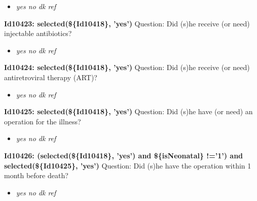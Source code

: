 \documentclass{article}%
\begin{document}
%
\begin{itemize}%
\item%
\textit{yes\newline%
 no\newline%
 dk\newline%
 ref\newline%
}%
\end{itemize}%
\textbf{Id10423: selected(\$\{Id10418\}, 'yes')\newline%
}%
Question: Did (s)he receive (or need) injectable antibiotics?\newline%
%
\begin{itemize}%
\item%
\textit{yes\newline%
 no\newline%
 dk\newline%
 ref\newline%
}%
\end{itemize}%
\textbf{Id10424: selected(\$\{Id10418\}, 'yes')\newline%
}%
Question: Did (s)he receive (or need) antiretroviral therapy (ART)?\newline%
%
\begin{itemize}%
\item%
\textit{yes\newline%
 no\newline%
 dk\newline%
 ref\newline%
}%
\end{itemize}%
\textbf{Id10425: selected(\$\{Id10418\}, 'yes')\newline%
}%
Question: Did (s)he have (or need) an operation for the illness?\newline%
%
\begin{itemize}%
\item%
\textit{yes\newline%
 no\newline%
 dk\newline%
 ref\newline%
}%
\end{itemize}%
\textbf{Id10426: (selected(\$\{Id10418\}, 'yes') and \$\{isNeonatal\} !='1') and selected(\$\{Id10425\}, 'yes')\newline%
}%
Question: Did (s)he have the operation within 1 month before death?\newline%
%
\begin{itemize}%
\item%
\textit{yes\newline%
 no\newline%
 dk\newline%
 ref\newline%
}%
\end{itemize}%
\end{document}
